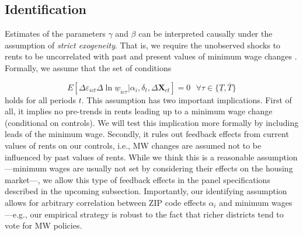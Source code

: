

\subsection{Identification}

Estimates of the parameters $\gamma$  and $\beta$ can be interpreted causally 
under the assumption of \textit{strict exogeneity}. 
That is, we require the unobserved shocks to rents to be uncorrelated with past 
and present values of minimum wage changes \parencite[][chapter 10]{wooldridge2010}.
Formally, we assume that the set of conditions

\begin{equation*}
	E[\Delta \varepsilon_{ict} \Delta \ln \underline{w}_{ic\tau}  
							| \alpha_i, \delta_t, \Delta \mathbf{X}_{ct}] = 0
	\ \ \ \forall \tau \in \{\underline{T}, \overline{T} \}
\end{equation*}
holds for all periods $t$. This assumption has two important implications. First of all, 
it implies no pre-trends in rents leading up to a minimum wage change (conditional on 
controls). We will test this implication more formally by including leads of the minimum 
wage. Secondly, it rules out feedback effects from current values of rents on our controls, 
i.e., MW changes are assumed not to be influenced by past values of rents. While we think 
this is a reasonable assumption---minimum wages are usually not set by considering their 
effects on the housing market---, we allow this type of feedback effects in the panel 
specifications described in the upcoming subsection. Importantly, our identifying assumption 
allows for arbitrary correlation between ZIP code effects $\alpha_i$ and minimum wages 
---e.g., our empirical strategy is robust to the fact that richer districts tend to vote 
for MW policies.



